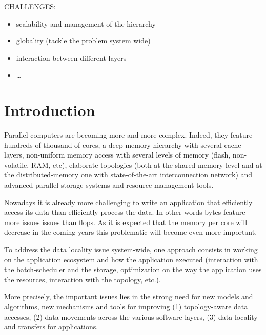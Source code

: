 CHALLENGES:
\begin{itemize}
\item scalability and management of the hierarchy
\item globality (tackle the problem system wide)
\item interaction between different layers
\item \ldots
\end{itemize}


\section{Introduction}
 

Parallel computers are becoming more and more complex. 
Indeed, they feature hundreds of thousand of cores, a deep memory hierarchy with 
several cache layers, non-uniform memory access with  several levels of memory (flash,
non-volatile, RAM, etc), elaborate topologies (both at the
shared-memory level and at the distributed-memory one with state-of-the-art
interconnection network) and advanced parallel storage systems and resource
management tools.

Nowadays it is already more challenging to write an application that efficiently
access its data than efficiently process the data. In other words bytes 
feature more issues issues than flops. As it is expected that the memory
per core will decrease in the coming years this problematic will become even
more important. 

To address the data locality issue system-wide, one approach consists in
working on the application ecosystem and how the application executed (interaction
with the batch-scheduler and the storage, optimization on the way the
application uses the resources, interaction with the topology, etc.). 

More precisely, the important issues lies in the strong need for new models and algorithms, new 
mechanisms and tools for improving (1) topology-aware data accesses, (2) data 
movements across the various software layers, (3) data locality and transfers for 
applications. 
